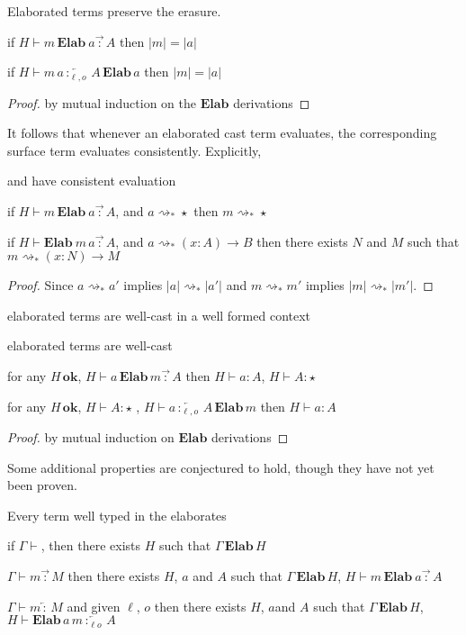 \begin{thm}
Elaborated terms preserve the erasure.
 
if $H\vdash m\,\textbf{Elab}\ a\overrightarrow{\,:\,}A$ then $|m|=|a|$
 
if $H\vdash m\,a\overleftarrow{\,:_{\ell,o}\,}A\,\textbf{Elab}\,a$ then $|m|=|a|$
\end{thm}
 
\begin{proof}
by mutual induction on the $\textbf{Elab}$ derivations
\end{proof}

It follows that whenever an elaborated cast term evaluates, the corresponding surface term evaluates consistently.
Explicitly,
\begin{thm}
\Slang{} and \clang{} have consistent evaluation
 
if $H\vdash m\,\textbf{Elab}\ a\overrightarrow{\,:\,}A$, and $a\rightsquigarrow_{*}\star$ then $m\rightsquigarrow_{*}\star$
 
if $H\vdash\textbf{Elab}\ m\,a\overrightarrow{\,:\,}A$, and $a\rightsquigarrow_{*}(x:A)\rightarrow B$ then there exists $N$ and $M$ such that $m\rightsquigarrow_{*}(x:N)\rightarrow M$
\end{thm}


\begin{proof}
Since $a\rightsquigarrow_{*}a'$ implies $|a|\rightsquigarrow_{*}|a'|$ and $m\rightsquigarrow_{*}m'$ implies $|m|\rightsquigarrow_{*}|m'|$.
\end{proof}
elaborated terms are well-cast in a well formed context 
\begin{thm}
elaborated terms are well-cast
 
for any $H\,\textbf{ok}$, $H\vdash a\,\textbf{Elab}\,m\overrightarrow{\,:\,}A$ then $H\vdash a:A$, $H\vdash A:\star$
 
for any $H\,\textbf{ok}$, $H\vdash A:\star$ , $H\vdash a\overleftarrow{\,:_{\ell,o}\,}A\,\textbf{Elab}\,m$ then $H\vdash a:A$
\end{thm}
 
\begin{proof}
by mutual induction on $\textbf{Elab}$ derivations
 

\end{proof}
Some additional properties are conjectured to hold, though they have not yet been proven.
\begin{conjecture}
Every term well typed in the \bidir{} \slang{} elaborates
 
if $\Gamma\vdash$, then there exists $H$ such that $\Gamma\,\textbf{Elab}\,H$
 
$\Gamma\vdash m\overrightarrow{\,:\,}M$ then there exists $H$, $a$ and $A$ such that $\Gamma\,\textbf{Elab}\,H$, $H\vdash m\,\textbf{Elab}\ a\overrightarrow{\,:\,}A$
 
$\Gamma\vdash m\overleftarrow{\,:\,}M$ and given $\ell$, $o$ then there exists $H$, $a$and $A$ such that $\Gamma\,\textbf{Elab}\,H$, $H\vdash\textbf{Elab}\,a\,m\overleftarrow{\,:_{\ell o}\,}A$
\end{conjecture}
 
